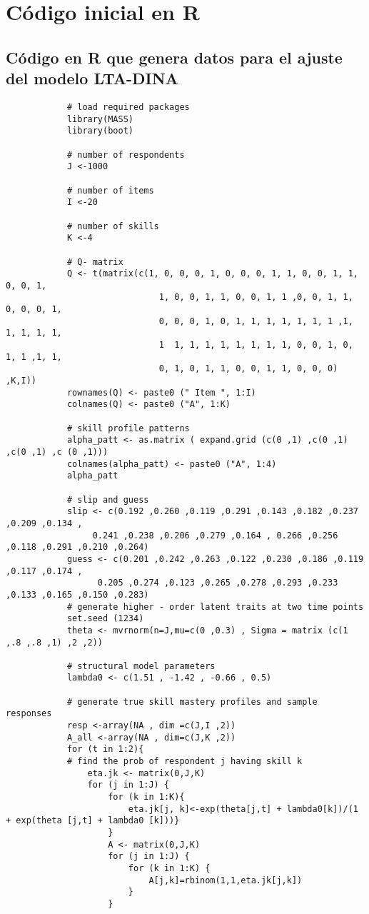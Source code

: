 \chapter{C\'{o}digo inicial en R}

	\section*{C\'{o}digo en R que genera datos para el ajuste del modelo LTA-DINA}
		\begin{lstlisting}
			# load required packages
			library(MASS)
			library(boot)
			
			# number of respondents
			J <-1000
			
			# number of items
			I <-20
			
			# number of skills
			K <-4
			
			# Q- matrix
			Q <- t(matrix(c(1, 0, 0, 0, 1, 0, 0, 0, 1, 1, 0, 0, 1, 1, 0, 0, 1, 
							  1, 0, 0, 1, 1, 0, 0, 1, 1 ,0, 0, 1, 1, 0, 0, 0, 1, 
							  0, 0, 0, 1, 0, 1, 1, 1, 1, 1, 1, 1 ,1, 1, 1, 1, 1, 
							  1  1, 1, 1, 1, 1, 1, 1, 1, 0, 0, 1, 0, 1, 1 ,1, 1,
							  0, 1, 0, 1, 1, 0, 0, 1, 1, 0, 0, 0) ,K,I))							  
			rownames(Q) <- paste0 (" Item ", 1:I)
			colnames(Q) <- paste0 ("A", 1:K)
			
			# skill profile patterns
			alpha_patt <- as.matrix ( expand.grid (c(0 ,1) ,c(0 ,1) ,c(0 ,1) ,c (0 ,1)))
			colnames(alpha_patt) <- paste0 ("A", 1:4)
			alpha_patt
			
			# slip and guess
			slip <- c(0.192 ,0.260 ,0.119 ,0.291 ,0.143 ,0.182 ,0.237 ,0.209 ,0.134 ,
		         0.241 ,0.238 ,0.206 ,0.279 ,0.164 , 0.266 ,0.256 ,0.118 ,0.291 ,0.210 ,0.264)
			guess <- c(0.201 ,0.242 ,0.263 ,0.122 ,0.230 ,0.186 ,0.119 ,0.117 ,0.174 ,
		          0.205 ,0.274 ,0.123 ,0.265 ,0.278 ,0.293 ,0.233 ,0.133 ,0.165 ,0.150 ,0.283)			
			# generate higher - order latent traits at two time points
			set.seed (1234)
			theta <- mvrnorm(n=J,mu=c(0 ,0.3) , Sigma = matrix (c(1 ,.8 ,.8 ,1) ,2 ,2))
			
			# structural model parameters
			lambda0 <- c(1.51 , -1.42 , -0.66 , 0.5)
			
			# generate true skill mastery profiles and sample responses
			resp <-array(NA , dim =c(J,I ,2))
			A_all <-array(NA , dim=c(J,K ,2))		
			for (t in 1:2){
		 	# find the prob of respondent j having skill k
			 	eta.jk <- matrix(0,J,K)
			 	for (j in 1:J) {
				  	for (k in 1:K){
				    	eta.jk[j, k]<-exp(theta[j,t] + lambda0[k])/(1 + exp(theta [j,t] + lambda0 [k]))}  
				    }
			 		A <- matrix(0,J,K)
			 		for (j in 1:J) {
			  			for (k in 1:K) {
			    			A[j,k]=rbinom(1,1,eta.jk[j,k])
			    		}  
			    	}
			    	

\end{lstlisting}
